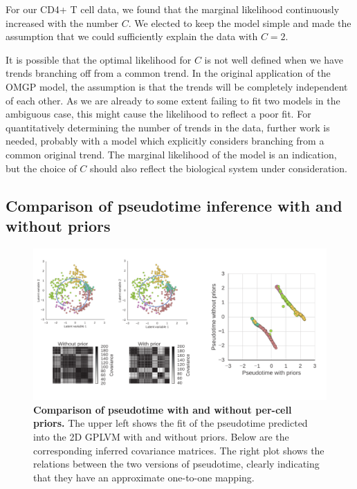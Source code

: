 For our CD4+ T cell data, we found that the marginal likelihood continuously increased with the number $ C $. We elected to keep the model simple and made the assumption that we could sufficiently explain the data with $ C = 2. $

It is possible that the optimal likelihood for \( C \) is not well defined when we have trends branching off from a common trend. In the original application of the OMGP model, the assumption is that the trends will be completely independent of each other. As we are already to some extent failing to fit two models in the ambiguous case, this might cause the likelihood to reflect a poor fit. For quantitatively determining the number of trends in the data, further work is needed, probably with a model which explicitly considers branching from a common original trend. The marginal likelihood of the model is an indication, but the choice of $ C $ should also reflect the biological system under consideration.

\subsection{Comparison of pseudotime inference with and without priors}

\begin{figure}
    \centering
    \includegraphics[width=\textwidth]{"fig-priors"}
    \caption[Comparison of pseudotime with and without per-cell priors]{\textbf{Comparison of pseudotime with and without per-cell priors.} The upper left shows the fit of the pseudotime predicted into the 2D GPLVM with and without priors. Below are the corresponding inferred covariance matrices. The right plot shows the relations between the two versions of pseudotime, clearly indicating that they have an approximate one-to-one mapping.}
    \label{fig:priors} 
\end{figure}


